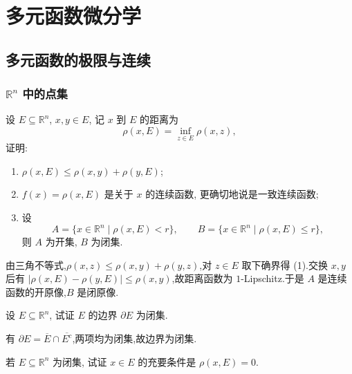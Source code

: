 \setcounter{chapter}{9}
\pagestyle{fancy}

\chapter{多元函数微分学}


\section{多元函数的极限与连续}


\subsection{\texorpdfstring{$\mathbb{R}^n$}{Rⁿ} 中的点集}

\begin{example}[\markstar]
    设 $E\subseteq\mathbb{R}^n$, $x,y\in E$, 记 $x$ 到 $E$ 的距离为
    \[
        \rho(x,E)=\inf_{z\in E}\rho(x,z),
    \]
    证明:
    \begin{enumerate}
        \item $\rho(x,E)\leq\rho(x,y)+\rho(y,E)$;
        \item $f(x)=\rho(x,E)$ 是关于 $x$ 的连续函数, 更确切地说是一致连续函数;
        \item 设
              \[
                  A=\{x\in\mathbb{R}^n\mid \rho(x,E)<r\},\qquad
                  B=\{x\in\mathbb{R}^n\mid \rho(x,E)\leq r\},
              \]
              则 $A$ 为开集, $B$ 为闭集.
    \end{enumerate}
\end{example}
\exampleblank

\begin{solution}
    由三角不等式,$\rho(x,z)\leq\rho(x,y)+\rho(y,z)$,对 $z\in E$ 取下确界得 (1).交换 $x,y$ 后有 $|\rho(x,E)-\rho(y,E)|\leq\rho(x,y)$,故距离函数为 $1$-Lipschitz.于是 $A$ 是连续函数的开原像,$B$ 是闭原像.
\end{solution}

\begin{example}
    设 $E\subseteq\mathbb{R}^n$, 试证 $E$ 的边界 $\partial E$ 为闭集.
\end{example}
\exampleblank

\begin{solution}
    有 $\partial E=\overline E\cap\overline{E^c}$,两项均为闭集,故边界为闭集.
\end{solution}

\begin{example}
    若 $E\subseteq\mathbb{R}^n$ 为闭集, 试证 $x\in E$ 的充要条件是 $\rho(x,E)=0$.
\end{example}
\exampleblank

